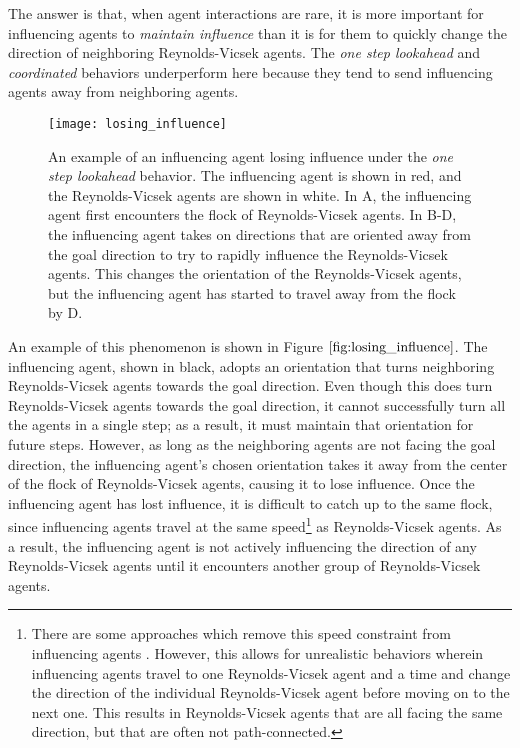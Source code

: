 The answer is that, when agent interactions are rare, it is more important for
influencing agents to \textit{maintain influence} than it is for them to quickly
change the direction of neighboring Reynolds-Vicsek agents.
The \textit{one step lookahead} and \textit{coordinated} behaviors underperform
here because they tend to send influencing agents away from neighboring agents.
\begin{figure}
    \texttt{[image: losing\_influence]}
    \caption{An example of an influencing agent losing influence under the
    \textit{one step lookahead} behavior.
    The influencing agent is shown in red, and the Reynolds-Vicsek agents are
    shown in white.
    In A, the influencing agent first encounters the flock of Reynolds-Vicsek
    agents.
    In B-D, the influencing agent takes on directions that are oriented away
    from the goal direction to try to rapidly influence the Reynolds-Vicsek
    agents.
    This changes the orientation of the Reynolds-Vicsek agents, but the
    influencing agent has started to travel away from the flock by D.}
    \label{fig:losing_influence}
\end{figure}
An example of this phenomenon is shown in Figure $\ref{fig:losing_influence}$.
The influencing agent, shown in black, adopts an orientation that turns
neighboring Reynolds-Vicsek agents towards the goal direction.
Even though this does turn Reynolds-Vicsek agents towards the goal direction, it cannot
successfully turn all the agents in a single step; as a result, it must maintain
that orientation for future steps.
However, as long as the neighboring agents are not facing the goal direction,
the influencing agent's chosen orientation takes it away from the center of the
flock of Reynolds-Vicsek agents, causing it to lose influence.
Once the influencing agent has lost influence, it is difficult to catch up to the
same flock, since influencing agents travel at the same speed\footnote{
There are some approaches which remove this speed constraint from
influencing agents \cite{han2010teleporting}.
However, this allows for unrealistic behaviors wherein influencing agents travel
to one Reynolds-Vicsek agent and a time and change the direction of the
individual Reynolds-Vicsek agent before moving on to the next one.
This results in Reynolds-Vicsek agents that are all facing the same direction,
but that are often not path-connected.}
as Reynolds-Vicsek agents.
As a result, the influencing agent is not actively influencing the direction of
any Reynolds-Vicsek agents until it encounters another group of Reynolds-Vicsek
agents.

